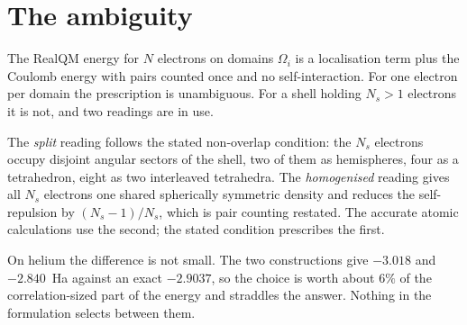 \documentclass[11pt]{article}
\begin{document}
\begin{abstract}
The energy is monotone along the family, and what that means turns on a question the formulation does
not settle: whether a partially blended configuration is admissible as a \emph{state}, or whether the
blending is a \emph{parameter} of the electron model. If a state, minimising selects full separation,
the model over-binds by $4.2\%$, and the more accurate homogenised shell is a higher-energy
configuration whose accuracy is cancellation rather than correctness. If a parameter, there is nothing
to minimise over, and what the computation reports instead is that the required blending is
\emph{interior} --- so RealQM would carry one \emph{universal} constant, against a core radius per
element or a functional per problem. The numbers are identical under both readings. The stated
non-overlap condition appears to exclude blended states, but it also excludes the blended shell the
accurate calculations use, so the formulation is not self-consistent here. We do not measure the
constant: the position along the family is not converged, and whether one value serves different
systems is untested.
\end{abstract}

\section{The ambiguity}

The RealQM energy for $N$ electrons on domains $\Omega_i$ is a localisation term plus the Coulomb
energy with pairs counted once and no self-interaction. For one electron per domain the prescription
is unambiguous. For a shell holding $N_s>1$ electrons it is not, and two readings are in use.

The \emph{split} reading follows the stated non-overlap condition: the $N_s$ electrons occupy
disjoint angular sectors of the shell, two of them as hemispheres, four as a tetrahedron, eight as
two interleaved tetrahedra. The \emph{homogenised} reading gives all $N_s$ electrons one shared
spherically symmetric density and reduces the self-repulsion by $(N_s-1)/N_s$, which is pair counting
restated. The accurate atomic calculations use the second; the stated condition prescribes the first.

On helium the difference is not small. The two constructions give $-3.018$ and $-2.840$~Ha against an
exact $-2.9037$, so the choice is worth about $6\%$ of the correlation-sized part of the energy and
straddles the answer. Nothing in the formulation selects between them.
\end{document}
